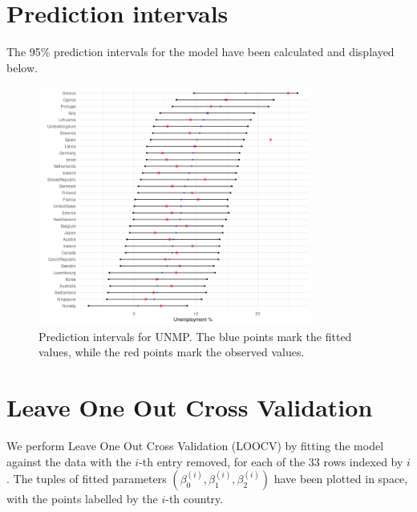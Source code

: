 \documentclass[10pt]{article}
\begin{document}
    \section{Prediction intervals}

    The 95\% prediction intervals for the model have been calculated and displayed
    below.

    \begin{figure}[H]
    \begin{center}
        \includegraphics[width=0.8\textwidth]{predicted_intervals.png}
    \end{center}
    \caption{Prediction intervals for UNMP. The blue points mark the fitted values,
    while the red points mark the observed values.}
    \label{fig:prediction}
    \end{figure}



    \section{Leave One Out Cross Validation}

    We perform Leave One Out Cross Validation (LOOCV) by fitting the model against
    the data with the $i$-th entry removed, for each of the 33 rows indexed by $i$.
    The tuples of fitted parameters $(\beta_0^{(i)}, \beta_1^{(i)}, \beta_2^{(i)})$
    have been plotted in space, with the points labelled by the $i$-th country.
\end{document}
